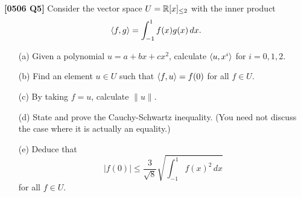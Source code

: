 \documentclass[a4paper]{article}
\begin{document}
\begin{problem}\textbf{[0506 Q5]}
 Consider the vector space $U={\mathbb{R}}[x]_{\leq 2}$ with the inner
 product 
 \[ \langle f,g\rangle = \int_{-1}^1 f(x)g(x)\,dx. \]
 \begin{itemize}
  \item[(a)] Given a polynomial $u=a+bx+cx^2$,
   calculate $\langle u,x^i\rangle$ for $i=0,1,2$. 
  \item[(b)] Find an element $u\in U$ such that
   $\langle f,u\rangle=f(0)$ for all $f\in U$. 
  \item[(c)] By taking $f=u$, calculate $\|u\|$. 
  \item[(d)] State and prove the Cauchy-Schwartz inequality.
   (You need not discuss the case where it is actually an
   equality.) 
  \item[(e)] Deduce that 
   \[ |f(0)|\leq
       \frac{3}{\sqrt{8}}\sqrt{\textstyle\int_{-1}^1 f(x)^2\,dx}
   \]
   for all $f\in U$. 
 \end{itemize}
\end{problem}
\end{document}
